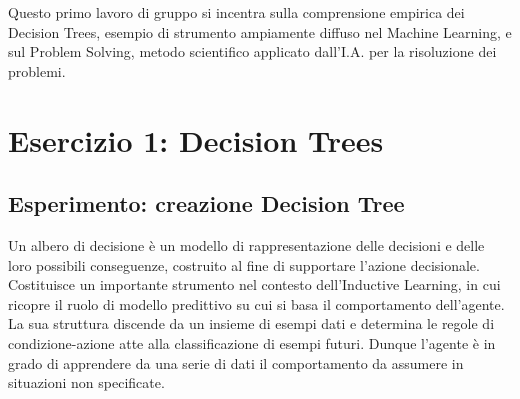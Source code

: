 \raggedright
{}
	\label{ch:dt}
	Questo primo lavoro di gruppo si incentra sulla comprensione empirica dei \textsf{Decision Trees}, esempio di strumento ampiamente diffuso nel \textsf{ Machine Learning}, e sul \textsf{Problem Solving}, metodo scientifico applicato dall'\textsf{I.A.} per la risoluzione dei problemi.
	\section{Esercizio 1: Decision Trees}
		\label{sec:es1}
		\subsection{Esperimento: creazione Decision Tree}
		Un albero di decisione è un modello di rappresentazione delle decisioni e delle loro possibili conseguenze, costruito al fine di supportare l'azione decisionale. Costituisce un importante strumento nel contesto dell'\textsf{Inductive Learning}, in cui ricopre il ruolo di modello predittivo su cui si basa il comportamento dell'agente. La sua struttura discende da un insieme di esempi dati e determina le regole di condizione-azione atte alla classificazione di esempi futuri. Dunque l'agente è in grado di apprendere da una serie di dati il comportamento da assumere in situazioni non specificate.
